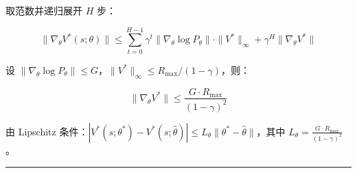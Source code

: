 \documentclass[UTF8]{ctexart}
\begin{document}
取范数并递归展开 \(H\) 步：

\[
\|\nabla_\theta V^*(s;\theta)\| \leq \sum_{t=0}^{H-1} \gamma^t \|\nabla_\theta \log P_\theta\| \cdot \|V^*\|_\infty + \gamma^H \|\nabla_\theta V^*\|
\]

设
\(\|\nabla_\theta \log P_\theta\| \leq G\)，\(\|V^*\|_\infty \leq R_{\max}/(1-\gamma)\)，则：

\[
\|\nabla_\theta V^*\| \leq \frac{G \cdot R_{\max}}{(1-\gamma)^2}
\]

由 Lipschitz
条件：\(|V^*(s;\theta^*) - V^*(s;\hat{\theta})| \leq L_\theta \|\theta^* - \hat{\theta}\|\)，其中
\(L_\theta = \frac{G \cdot R_{\max}}{(1-\gamma)^2}\)。

\begin{center}\rule{0.5\linewidth}{0.4pt}\end{center}
\end{document}
